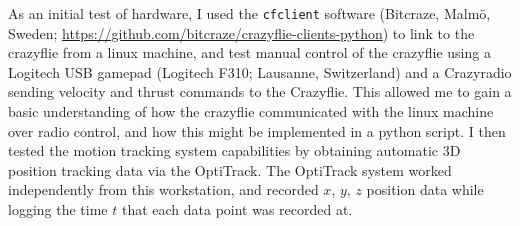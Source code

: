 As an initial test of hardware, I used the \lstinline{cfclient} software (Bitcraze, Malm\"{o}, Sweden; \url{https://github.com/bitcraze/crazyflie-clients-python}) to link to the crazyflie from a linux machine, and test manual control of the crazyflie using a Logitech USB gamepad (Logitech F310; Lausanne, Switzerland) and a Crazyradio sending velocity and thrust commands to the Crazyflie. This allowed me to gain a basic understanding of how the crazyflie communicated with the linux machine over radio control, and how this might be implemented in a python script. I then tested the motion tracking system capabilities by obtaining automatic 3D position tracking data via the OptiTrack. The OptiTrack system worked independently from this workstation, and recorded $x$, $y$, $z$ position data while logging the time $t$ that each data point was recorded at. 



